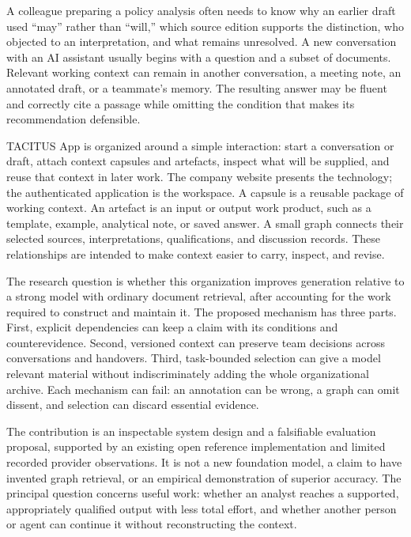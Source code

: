 \documentclass[
  11pt,
]{article}
\begin{document}
A colleague preparing a policy analysis often needs to know why an
earlier draft used ``may'' rather than ``will,'' which source edition
supports the distinction, who objected to an interpretation, and what
remains unresolved. A new conversation with an AI assistant usually
begins with a question and a subset of documents. Relevant working
context can remain in another conversation, a meeting note, an annotated
draft, or a teammate's memory. The resulting answer may be fluent and
correctly cite a passage while omitting the condition that makes its
recommendation defensible.

TACITUS App is organized around a simple interaction: start a
conversation or draft, attach context capsules and artefacts, inspect
what will be supplied, and reuse that context in later work. The company
website presents the technology; the authenticated application is the
workspace. A capsule is a reusable package of working context. An
artefact is an input or output work product, such as a template,
example, analytical note, or saved answer. A small graph connects their
selected sources, interpretations, qualifications, and discussion
records. These relationships are intended to make context easier to
carry, inspect, and revise.

The research question is whether this organization improves generation
relative to a strong model with ordinary document retrieval, after
accounting for the work required to construct and maintain it. The
proposed mechanism has three parts. First, explicit dependencies can
keep a claim with its conditions and counterevidence. Second, versioned
context can preserve team decisions across conversations and handovers.
Third, task-bounded selection can give a model relevant material without
indiscriminately adding the whole organizational archive. Each mechanism
can fail: an annotation can be wrong, a graph can omit dissent, and
selection can discard essential evidence.

The contribution is an inspectable system design and a falsifiable
evaluation proposal, supported by an existing open reference
implementation and limited recorded provider observations. It is not a
new foundation model, a claim to have invented graph retrieval, or an
empirical demonstration of superior accuracy. The principal question
concerns useful work: whether an analyst reaches a supported,
appropriately qualified output with less total effort, and whether
another person or agent can continue it without reconstructing the
context.
\end{document}
